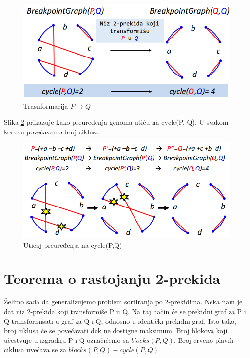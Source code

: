 \begin{figure}[h!]
\centering
\includegraphics[scale=0.7]{poglavlja/6/slike/transfBreakpoint.PNG}
\caption{Trasnformacija $P\rightarrow Q$ }
\label{slika:preuređenje}
\end{figure}

Slika \ref{slika:nizPromena} prikazuje kako preuređenja genoma utiču na cycle(P, Q). U svakom koraku povećavamo broj ciklusa.

\begin{figure}[h!]
\centering
\includegraphics[scale=0.7]{poglavlja/6/slike/preuredjenja_cycle.PNG}
\caption{Uticaj preuređenja na cycle(P,Q)}
\label{slika:nizPromena}
\end{figure}


\section{Teorema o rastojanju 2-prekida}

Želimo sada da generalizujemo problem sortiranja po 2-prekidima. Neka nam je dat niz 2-prekida koji transformiše P u Q. Na taj način će se prekidni graf za P i Q transformisati u graf za Q i Q, odnosno u identički prekidni graf. Isto tako, broj ciklusa će se povećavati dok ne dostigne maksimum. Broj blokova koji učestvuje u izgradnji P i Q označićemo sa $blocks(P, Q)$. Broj crveno-plavih ciklusa uvećava se za $blocks(P, Q) - cycle(P, Q)$

